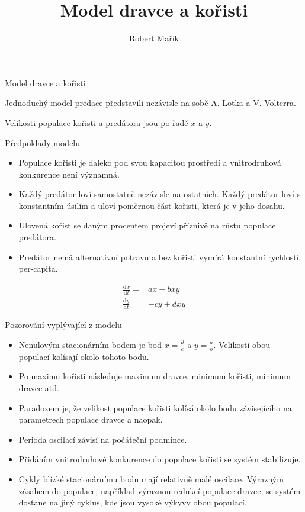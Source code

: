 \documentclass[handouts]{beamer}
\title{Model dravce a kořisti}
\author{Robert Mařík}
\begin{document}
\begin{frame}
  
\begin{center}
  \large 
Model dravce a kořisti
\end{center}


Jednoduchý model predace představili nezávisle na sobě A. Lotka a
V. Volterra.

Velikosti populace kořisti a predátora jsou po řadě $x$ a $y$.

\begin{block}{Předpoklady modelu}

\begin{itemize}
\item Populace kořisti je daleko pod svou kapacitou prostředí a
  vnitrodruhová konkurence není významná.
\item Každý predátor loví samostatně nezávisle na ostatních. Každý
  predátor loví s konstantním úsilím a uloví poměrnou část kořisti, která je v jeho dosahu.
\item Ulovená kořist se daným procentem projeví příznivě na růstu populace predátora. 
\item Predátor nemá alternativní potravu a bez kořisti vymírá konstantní rychlostí per-capita.
\end{itemize}
\end{block}
\begin{equation*}
\begin{aligned}
\frac{\mathrm dx}{\mathrm dt}={}&ax-bxy\\
\frac{\mathrm dy}{\mathrm dt}={}&-cy+dxy
\end{aligned}
\end{equation*}

\begin{block}{Pozorování vyplývající z modelu}
\begin{itemize}
\item Nenulovým stacionárním bodem je bod $x=\frac dc$ a $y=\frac
ab$. Velikosti obou populací kolísají okolo tohoto bodu. 
\item Po maximu kořisti následuje maximum dravce, minimum kořisti, minimum dravce atd. 
\item Paradoxem je, že velikost populace kořisti kolísá okolo bodu závisejícího na parametrech populace dravce a naopak. 
\item Perioda oscilací závisí na počáteční podmínce.  
\item Přidáním vnitrodruhové konkurence do populace kořisti se systém stabilizuje. 
\item Cykly blízké stacionárnímu bodu mají relativně malé oscilace. Výrazným zásahem do populace, například výraznou redukcí populace dravce, se systém dostane na jiný cyklus, kde jsou vysoké výkyvy obou populací. 
  

\end{itemize}
\end{block}
\end{frame}
\end{document}
